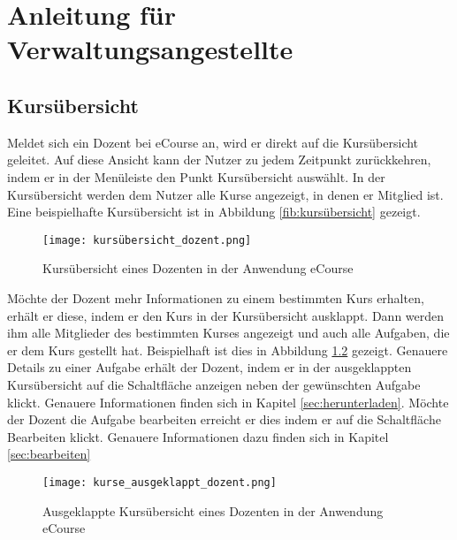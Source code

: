 
\chapter{Anleitung für Verwaltungsangestellte}
\label{sec:chap2}

\section{Kursübersicht}
Meldet sich ein Dozent bei eCourse an, wird er direkt auf die Kursübersicht geleitet. Auf diese Ansicht kann der Nutzer zu jedem Zeitpunkt zurückkehren, indem er in der Menüleiste den Punkt \glqq Kursübersicht \grqq auswählt. In der Kursübersicht werden dem Nutzer alle Kurse angezeigt, in denen er Mitglied ist. Eine beispielhafte Kursübersicht ist in Abbildung \ref{fib:kursübersicht} gezeigt.

\begin{figure}[h]
\centering
\texttt{[image: kursübersicht\_dozent.png]}
\caption{Kursübersicht eines Dozenten in der Anwendung eCourse}
\label{fib:kursübersicht_dozent}
\end{figure}

Möchte der Dozent mehr Informationen zu einem bestimmten Kurs erhalten, erhält er diese, indem er den Kurs in der Kursübersicht ausklappt. Dann werden ihm alle Mitglieder des bestimmten Kurses angezeigt und auch alle Aufgaben, die er dem Kurs gestellt hat. Beispielhaft ist dies in Abbildung \ref{fib:kursübersicht_dozent_ausgeklappt} gezeigt. Genauere Details zu einer Aufgabe erhält der Dozent, indem er in der ausgeklappten Kursübersicht auf die Schaltfläche \glqq anzeigen\grqq\; neben der gewünschten Aufgabe klickt. Genauere Informationen finden sich in Kapitel \ref{sec:herunterladen}. Möchte der Dozent die Aufgabe bearbeiten erreicht er dies indem er auf die Schaltfläche \glqq Bearbeiten\grqq\; klickt. Genauere Informationen dazu finden sich in Kapitel \ref{sec:bearbeiten}
 
\begin{figure}[h]
\centering
\texttt{[image: kurse\_ausgeklappt\_dozent.png]}
\caption{Ausgeklappte Kursübersicht eines Dozenten in der Anwendung eCourse}
\label{fib:kursübersicht_dozent_ausgeklappt}
\end{figure}

